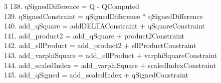 \documentclass[10pt]{article}
\begin{document}
\begin{multicols}{3}
138. qSignedDifference = Q - QComputed\\
139. qSignedConstraint = qSignedDifference * qSignedDifference\\
140. add\_qSquare = addDELTAConstraint + qSquareConstraint\\
141. add\_product2 = add\_qSquare + product2Constraint\\
142. add\_ellProduct = add\_product2 + ellProductConstraint\\
143. add\_varphiSquare = add\_ellProduct + varphiSquareConstraint\\
144. add\_scaledIndex = add\_varphiSquare + scaledIndexConstraint\\
145. add\_qSigned = add\_scaledIndex + qSignedConstraint\\
\end{multicols}
\end{document}
